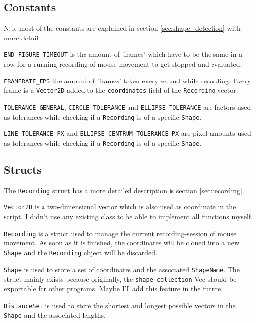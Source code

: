 \documentclass[12pt, a4paper]{article}
\begin{document}
        {
            \raggedright
            \subsection{Constants}
                N.b. most of the constants are explained in section \ref{sec:shape_detection} with more detail.\break

                \texttt{END\_FIGURE\_TIMEOUT} is the amount of 'frames' which have to be the same in a row for a running recording of mouse movement to get stopped and evaluated.\break

                \texttt{FRAMERATE\_FPS} the amount of 'frames' taken every second while recording. Every frame is a \texttt{Vector2D} added to the \texttt{coordinates} field of the \texttt{Recording} vector.\break

                \texttt{TOLERANCE\_GENERAL}, \texttt{CIRCLE\_TOLERANCE} and \texttt{ELLIPSE\_TOLERANCE} are factors used as tolerances while checking if a \texttt{Recording} is of a specific \texttt{Shape}.\break

                \texttt{LINE\_TOLERANCE\_PX} and \texttt{ELLIPSE\_CENTRUM\_TOLERANCE\_PX} are pixel amounts used as tolerances while checking if a \texttt{Recording} is of a specific \texttt{Shape}.

            \subsection{Structs}
                \label{sec:structs}
                The \texttt{Recording} struct has a more detailed description is section \ref{sec:recording}.\break

                \texttt{Vector2D} is a two-dimensional vector which is also used as coordinate in the script. I didn't use any existing class to be able to implement all functions myself.\break

                \texttt{Recording} is a struct used to manage the current recording-session of mouse movement. As soon as it is finished, the coordinates will be cloned into a new \texttt{Shape} and the \texttt{Recording} object will be discarded.\break

                \texttt{Shape} is used to store a set of coordinates and the associated \texttt{ShapeName}. The struct mainly exists because originally, the \texttt{shape\_collection} Vec should be exportable for other programs. Maybe I'll add this feature in the future.\break

                \texttt{DistanceSet} is used to store the shortest and longest possible vectors in the \texttt{Shape} and the associated lengths.\break

}
\end{document}
